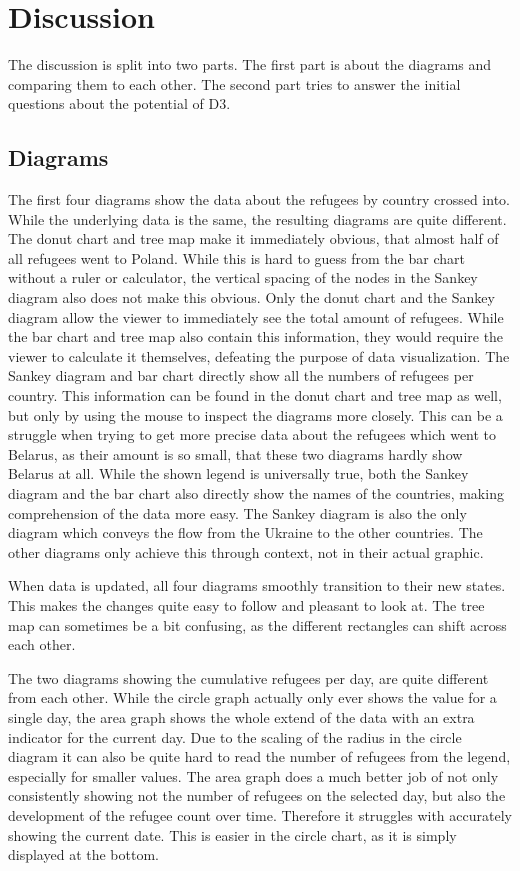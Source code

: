 \chapter{Discussion}\label{sec:discussion}
The discussion is split into two parts. The first part is about the diagrams and comparing them to each other. The second part tries to answer the initial questions about the potential of D3.

\section{Diagrams}
The first four diagrams show the data about the refugees by country crossed into. While the underlying data is the same, the resulting diagrams are quite different. 
The donut chart and tree map make it immediately obvious, that almost half of all refugees went to Poland. While this is hard to guess from the bar chart without a ruler or calculator, the vertical spacing of the nodes in the Sankey diagram also does not make this obvious.
Only the donut chart and the Sankey diagram allow the viewer to immediately see the total amount of refugees. While the bar chart and tree map also contain this information, they would require the viewer to calculate it themselves, defeating the purpose of data visualization.
The Sankey diagram and bar chart directly show all the numbers of refugees per country. This information can be found in the donut chart and tree map as well, but only by using the mouse to inspect the diagrams more closely. This can be a struggle when trying to get more precise data about the refugees which went to Belarus, as their amount is so small, that these two diagrams hardly show Belarus at all.
While the shown legend is universally true, both the Sankey diagram and the bar chart also directly show the names of the countries, making comprehension of the data more easy.
The Sankey diagram is also the only diagram which conveys the flow from the Ukraine to the other countries. The other diagrams only achieve this through context, not in their actual graphic.

When data is updated, all four diagrams smoothly transition to their new states. This makes the changes quite easy to follow and pleasant to look at. The tree map can sometimes be a bit confusing, as the different rectangles can shift across each other.

The two diagrams showing the cumulative refugees per day, are quite different from each other. While the circle graph actually only ever shows the value for a single day, the area graph shows the whole extend of the data with an extra indicator for the current day.
Due to the scaling of the radius in the circle diagram it can also be quite hard to read the number of refugees from the legend, especially for smaller values.
The area graph does a much better job of not only consistently showing not the number of refugees on the selected day, but also the development of the refugee count over time. Therefore it struggles with accurately showing the current date. This is easier in the circle chart, as it is simply displayed at the bottom.

